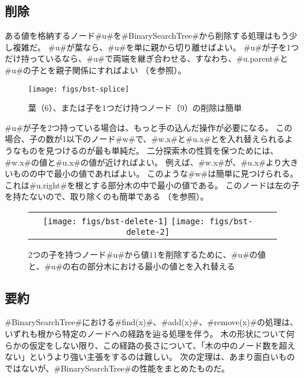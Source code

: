 \subsection{削除}

ある値を格納するノード#u#を#BinarySearchTree#から削除する処理はもう少し複雑だ。
#u#が葉なら、#u#を単に親から切り離せばよい。
#u#が子を1つだけ持っているなら、#u#で両端を継ぎ合わせる、すなわち、#u.parent#と#u#の子とを親子関係にすればよい
（を参照）。

\begin{figure}
  \begin{center}
    \texttt{[image: figs/bst-splice]}
  \end{center}
  \caption{葉（$6$）、または子を1つだけ持つノード（$9$）の削除は簡単}
\end{figure}

#u#が子を2つ持っている場合は、もっと手の込んだ操作が必要になる。
この場合、子の数が1以下のノード#w#で、#w.x#と#u.x#とを入れ替えられるようなものを見つけるのが最も単純だ。
二分探索木の性質を保つためには、#w.x#の値と#u.x#の値が近ければよい。
例えば、#w.x#が、#u.x#より大きいものの中で最小の値であればよい。
このような#w#は簡単に見つけられる。
これは#u.right#を根とする部分木の中で最小の値である。
このノードは左の子を持たないので、取り除くのも簡単である
（を参照）。

\begin{figure}
  \begin{center}
    \begin{tabular}{cc}
    \texttt{[image: figs/bst-delete-1]}
    \texttt{[image: figs/bst-delete-2]}
    \end{tabular}
  \end{center}
  \caption{2つの子を持つノード#u#から値$11$を削除するために、#u#の値と、#u#の右の部分木における最小の値とを入れ替える}
\end{figure}

\subsection{要約}

#BinarySearchTree#における#find(x)#、#add(x)#、#remove(x)#の処理は、いずれも根から特定のノードへの経路を辿る処理を伴う。
木の形状について何らかの仮定をしない限り、この経路の長さについて、「木の中のノード数を超えない」というより強い主張をするのは難しい。
次の定理は、あまり面白いものではないが、#BinarySearchTree#の性能をまとめたものだ。

